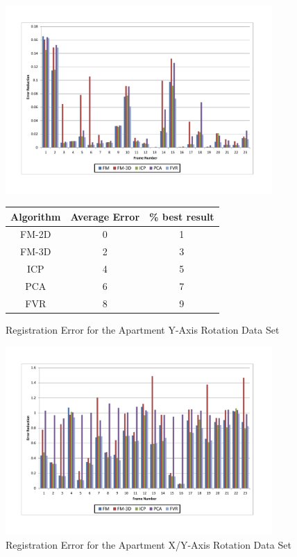 \begin{figure}
\centering
\includegraphics[width=4in]{images/results/Apartment_Texture_Rotate}
\caption{Registration Error for the Apartment Y-Axis Rotation Data Set}
\label{fig:PET0}

\begin{tabular}{ccc}
\hline
\textbf{Algorithm} & \textbf{Average Error} & \textbf{\% best result}\\ \hline
FM-2D	& 0 & 1\\
FM-3D	& 2 & 3\\
ICP		& 4 & 5\\
PCA		& 6 & 7\\
FVR		& 8 & 9\\
\end{tabular}
\label{tab:PET0ST}
\end{figure} 


\begin{figure}[!htb]
\centering
\includegraphics[width=4.0in]{images/results/Apartment_Texture_Rotate_XAxis}
\caption{Registration Error for the Apartment X/Y-Axis Rotation Data Set}
\label{fig:PET1}
\end{figure}

